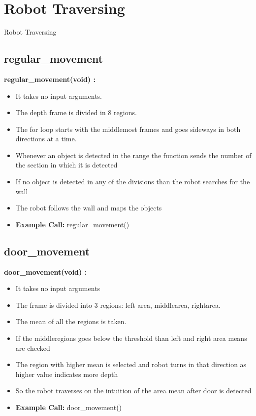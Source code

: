 \documentclass[10pt, a4paper]{beamer}
\begin{document}
\section{Robot Traversing}
\begin{frame}[allowframebreaks]{Robot Traversing}
  \subsection{regular\_movement}
    \textbf{regular\_movement(void) : }
	\begin{itemize}
	  \item It takes no input arguments.
	  \item The depth frame is divided in 8 regions.
	  \item The for loop starts with the middlemost frames and goes sideways in both directions at a time.
	  \item Whenever an object is detected in the range the function sends the number of the section in which it is detected
	  \item If no object is detected in any of the divisions than the robot searches for the wall
	  \item The robot follows the wall and maps the objects
	  \item \textbf{Example Call:} regular\_movement()
	\end{itemize}
  \framebreak
  \subsection{door\_movement}
    \textbf{door\_movement(void) : }
      \begin{itemize}
       \item It takes no input arguments
       \item The frame is divided into 3 regions: left area, middlearea, rightarea.
       \item The mean of all the regions is taken.
       \item If the middleregions goes below the threshold than left and right area means are checked
       \item The region with higher mean is selected and robot turns in that direction as higher value indicates more depth
       \item So the robot traverses on the intuition of the area mean after door is detected
       \item \textbf{Example Call:} door\_movement()
      \end{itemize}
  \framebreak

\end{frame}
\end{document}
